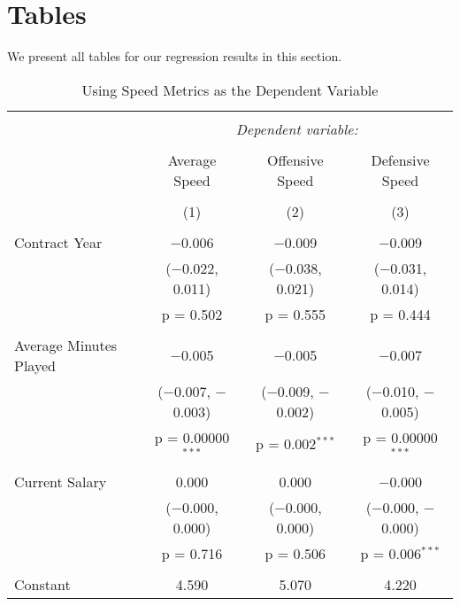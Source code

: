 \documentclass[12pt]{article}
\begin{document}
	
	
	\clearpage
	
	\onehalfspacing
	
	\appendix
	
	\section{Tables} \label{sec:tab}
	
	We present all tables for our regression results in this section.
	
	\begin{sidewaystable}[!htbp] \centering 
		\caption{Using Speed Metrics as the Dependent Variable} 
		\label{} 
		\begin{tabular}{@{\extracolsep{5pt}}lccc} 
			\\[-1.8ex]\hline 
			\hline \\[-1.8ex] 
			& \multicolumn{3}{c}{\textit{Dependent variable:}} \\ 
			\cline{2-4} 
			\\[-1.8ex] & Average Speed & Offensive Speed & Defensive Speed \\ 
			\\[-1.8ex] & (1) & (2) & (3)\\ 
			\hline \\[-1.8ex] 
			Contract Year & $-$0.006 & $-$0.009 & $-$0.009 \\ 
			& ($-$0.022, 0.011) & ($-$0.038, 0.021) & ($-$0.031, 0.014) \\ 
			& p = 0.502 & p = 0.555 & p = 0.444 \\ 
			& & & \\ 
			Average Minutes Played & $-$0.005 & $-$0.005 & $-$0.007 \\ 
			& ($-$0.007, $-$0.003) & ($-$0.009, $-$0.002) & ($-$0.010, $-$0.005) \\ 
			& p = 0.00000$^{***}$ & p = 0.002$^{***}$ & p = 0.00000$^{***}$ \\ 
			& & & \\ 
			Current Salary & 0.000 & 0.000 & $-$0.000 \\ 
			& ($-$0.000, 0.000) & ($-$0.000, 0.000) & ($-$0.000, $-$0.000) \\ 
			& p = 0.716 & p = 0.506 & p = 0.006$^{***}$ \\ 
			& & & \\ 
			Constant & 4.590 & 5.070 & 4.220 \\ 

\end{tabular}
\end{sidewaystable}
\end{document}
